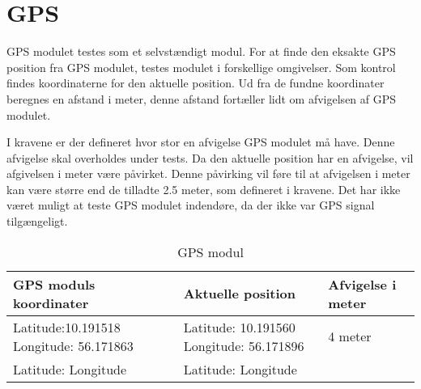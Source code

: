 \section{GPS}

GPS modulet testes som et selvstændigt modul.
For at finde den eksakte GPS position fra GPS modulet, testes modulet i forskellige omgivelser. Som kontrol findes koordinaterne for den aktuelle position. Ud fra de fundne koordinater beregnes en afstand i meter, denne afstand fortæller lidt om afvigelsen af GPS modulet. 

I kravene er der defineret hvor stor en afvigelse GPS modulet må have. Denne afvigelse skal overholdes under tests. Da den aktuelle position har en afvigelse, vil afgivelsen i meter være påvirket. Denne påvirking vil føre til at afvigelsen i meter kan være større end de tilladte 2.5 meter, som defineret i kravene.
Det har ikke været muligt at teste GPS modulet indendøre, da der ikke var GPS signal tilgængeligt. 

\begin{table}[H]
\begin{tabular}{| p{4cm}| p{4cm}| p{3cm}|}
\hline
GPS moduls koordinater & Aktuelle position & Afvigelse i meter\\\hline
Latitude:10.191518 \newline Longitude: 56.171863 & Latitude: 10.191560 \newline Longitude: 56.171896 & 4 meter\\\hline
Latitude: \newline Longitude & Latitude: \newline Longitude & \\\hline

\end{tabular}
\caption{GPS modul}
\label{tab:GPS_modul}
\end{table}

